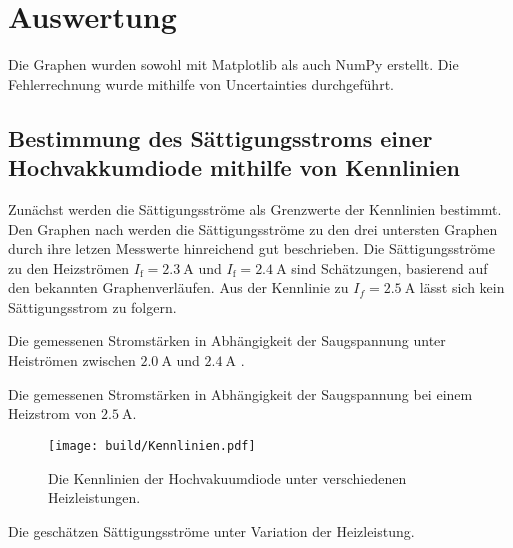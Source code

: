 \section{Auswertung}
\label{sec:Auswertung}

Die Graphen wurden sowohl mit Matplotlib \cite{matplotlib} als auch NumPy \cite{numpy} erstellt. Die
 Fehlerrechnung wurde mithilfe von Uncertainties \cite{uncertainties} durchgeführt.


 \subsection{Bestimmung des Sättigungsstroms einer Hochvakkumdiode mithilfe von Kennlinien}
Zunächst werden die Sättigungsströme als Grenzwerte der Kennlinien bestimmt. Den Graphen nach werden die
Sättigungsströme zu den drei untersten Graphen durch ihre letzen Messwerte hinreichend
gut beschrieben. Die Sättigungsströme zu den Heizströmen $I_\text{f} = \SI{2.3}{\ampere}$ und $I_\text{f} = \SI{2.4}{\ampere}$
sind Schätzungen, basierend auf den bekannten Graphenverläufen. Aus der Kennlinie
zu $I_f = \SI{2.5}{\ampere}$ lässt sich kein Sättigungsstrom zu folgern.

 \begin{table}
 	\centering
 	\caption{Die gemessenen Stromstärken in Abhängigkeit der Saugspannung unter Heiströmen zwischen $\SI{2,0}{\ampere}$ und $\SI{2,4}{\ampere}$ .}
 	
 \end{table}

 \begin{table}
  \centering
  \caption{Die gemessenen Stromstärken in Abhängigkeit der Saugspannung bei einem Heizstrom von $\SI{2,5}{\ampere}$.}
  
  
 \end{table}

 \begin{figure}
 	\centering
 	\caption{Die Kennlinien der Hochvakuumdiode unter verschiedenen Heizleistungen.}
 	\texttt{[image: build/Kennlinien.pdf]}
 	\label{fig:Graph}
 \end{figure}

 \begin{table}
  \centering
  \caption{Die geschätzen Sättigungsströme unter Variation der Heizleistung.}
  
 \end{table}




